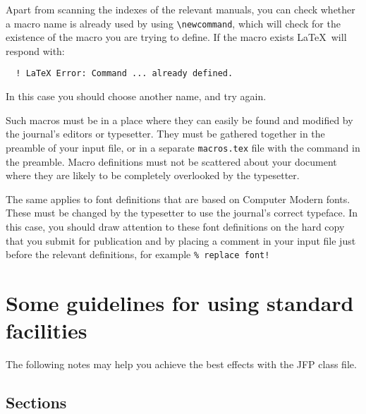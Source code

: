 \documentclass{jfp}
\begin{document}
Apart from scanning the indexes of the relevant manuals, you can check
whether a macro name is already used by using \verb"\newcommand", which
will check for the existence of the macro you are trying to define.
If the macro exists \LaTeX\ will respond with:
%
\begin{verbatim}
  ! LaTeX Error: Command ... already defined.
\end{verbatim}
%
In this case you should choose another name, and try again.

Such macros must be in a place where they can easily be found and
modified by the journal's editors or typesetter. They must be gathered
together in the preamble of your input file, or in a separate
\verb"macros.tex" file with the command \verb"" in the
preamble. Macro definitions must not be scattered about your document
where they are likely to be completely overlooked by the typesetter.

The same applies to font definitions that are based on Computer Modern
fonts. These must be changed by the typesetter to use the journal's
correct typeface. In this case, you should draw
attention to these font definitions on the hard copy that you submit for
publication and by placing a comment in your input file just before the
relevant definitions, for example \verb"% replace font!"

\section{Some guidelines for using standard facilities}

The following notes may help you achieve the best effects with the JFP class file.

\subsection{Sections}
\end{document}
